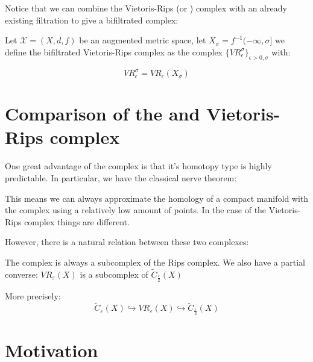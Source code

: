 Notice that we can combine the Vietoris-Rips (or {\Cech}) complex 
with an already existing filtration to give a bifiltrated complex:

\begin{definition}

Let $\mathcal{X}=(X,d,f)$ be an augmented metric space,
let $X_\sigma=f^{-1}(-\infty,\sigma]$ we define the bifiltrated
Vietoris-Rips complex as the complex
$\{{VR}_\epsilon^\sigma\}_{\epsilon>0,\sigma}$
with:

$$
{VR}_\epsilon^\sigma=
{VR}_\epsilon(X_\sigma)
$$

\end{definition}

\section{Comparison of the {\Cech} and Vietoris-Rips complex}

One great advantage of the {\Cech} complex is that it's homotopy type is highly predictable.
In particular, we have the classical {\Cech} nerve theorem:

This means we can always approximate the homology of a compact
manifold with the {\Cech} complex using a relatively low amount of points.
In the case of the Vietoris-Rips complex things are different.


However, there is a natural relation between these two complexes:

\begin{proposition}
The {\Cech} complex is always a subcomplex of the Rips complex. 
We also have a partial converse:
$VR_\varepsilon(X)$ is a subcomplex of $\tilde C_\frac{\varepsilon}{2}(X)$

More precisely:
$$
\tilde C_\varepsilon(X)
\hookrightarrow
VR_\varepsilon(X)
\hookrightarrow
\tilde C_\frac{\varepsilon}{2}(X)
$$
\end{proposition}


\section{Motivation}



